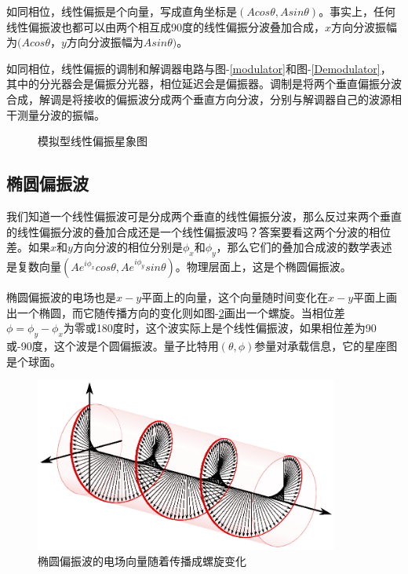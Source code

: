 \documentclass{ctexbook}
\begin{document}
如同相位，线性偏振是个向量，写成直角坐标是$(A cos\theta, A sin\theta)$。事实上，任何线性偏振波也都可以由两个相互成90度的线性偏振分波叠加合成，$x$方向分波振幅为$(A cos\theta$，$y$方向分波振幅为$A sin\theta)$。

如同相位，线性偏振的调制和解调器电路与图-\ref{modulator}和图-\ref{Demodulator}，其中的分光器会是偏振分光器，相位延迟会是偏振器。调制是将两个垂直偏振分波合成，解调是将接收的偏振波分成两个垂直方向分波，分别与解调器自己的波源相干测量分波的振幅。

\begin{figure}[h]\label{PolarM}
\caption{模拟型线性偏振星象图}
\end{figure}

\subsection{椭圆偏振波}\label{s-elliptic}
我们知道一个线性偏振波可是分成两个垂直的线性偏振分波，那么反过来两个垂直的线性偏振分波的叠加合成还是一个线性偏振波吗？答案要看这两个分波的相位差。如果$x$和$y$方向分波的相位分别是$\phi_x$和$\phi_y$，那么它们的叠加合成波的数学表述是复数向量$(A e^{i\phi_x} cos\theta, A e^{i\phi_y} sin\theta)$。物理层面上，这是个椭圆偏振波。

椭圆偏振波的电场也是$x-y$平面上的向量，这个向量随时间变化在$x-y$平面上画出一个椭圆，而它随传播方向的变化则如图-\ref{CircularP}画出一个螺旋。当相位差$\phi=\phi_y-\phi_x$为零或180度时，这个波实际上是个线性偏振波，如果相位差为90或-90度，这个波是个圆偏振波。量子比特用$(\theta, \phi)$参量对承载信息，它的星座图是个球面。

\begin{figure}[h]\label{CircularP}
\includegraphics[width=10cm]{pic/CircularPolarization.eps}
\caption{椭圆偏振波的电场向量随着传播成螺旋变化}
\end{figure}
\end{document}

